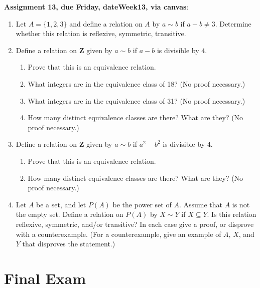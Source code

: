 \documentclass[12pt]{article}
\begin{document}
\noindent \textbf{Assignment 13, due Friday, \csname dateWeek13\endcsname, via canvas}:
\begin{enumerate}
\item Let $A = \{1,2,3\}$ and define a relation on $A$ by $a \sim b$ if $a + b \neq 3$. Determine whether this relation is reflexive, symmetric, transitive.
\item Define a relation on $\mathbf{Z}$ given by $a \sim b$ if $a-b$ is divisible by $4$.
 \begin{enumerate}
 \item Prove that this is an equivalence relation.
 \item What integers are in the equivalence class of 18? (No proof necessary.)
 \item What integers are in the equivalence class of 31? (No proof necessary.) 
 \item How many distinct equivalence classes are there? What are they? (No proof necessary.)
 \end{enumerate}
\item Define a relation on $\mathbf{Z}$ given by $a \sim b$ if $a^2-b^2$ is divisible by $4$.
 \begin{enumerate}
 \item Prove that this is an equivalence relation.
 \item How many distinct equivalence classes are there? What are they? (No proof necessary.)
 \end{enumerate} 
\item Let $A$ be a set, and let $P(A)$ be the power set of $A$. Assume that $A$ is not the empty set. Define a relation on $P(A)$ by $X \sim Y$ if $X \subseteq Y$. Is this relation reflexive, symmetric, and/or transitive? In each case give a proof, or disprove with a counterexample. (For a counterexample, give an example of $A$, $X$, and $Y$ that disproves the statement.)
\end{enumerate}





\newpage
\section[Final Exam]{Final Exam}
\end{document}
